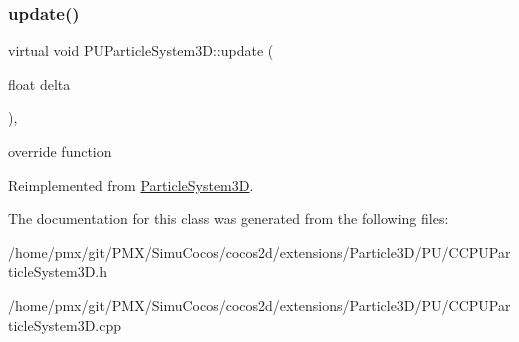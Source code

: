 \subsubsection{\texorpdfstring{update()}{update()}\hspace{0.1cm}{\footnotesize\ttfamily [2/2]}}
{\footnotesize\ttfamily virtual void P\+U\+Particle\+System3\+D\+::update (\begin{DoxyParamCaption}\item[{float}]{delta }\end{DoxyParamCaption})\hspace{0.3cm}{\ttfamily [override]}, {\ttfamily [virtual]}}

override function 

Reimplemented from \hyperlink{classParticleSystem3D_a04fb4f09a517f393b5deb8174b964e40}{Particle\+System3D}.



The documentation for this class was generated from the following files\+:\begin{DoxyCompactItemize}
\item 
/home/pmx/git/\+P\+M\+X/\+Simu\+Cocos/cocos2d/extensions/\+Particle3\+D/\+P\+U/C\+C\+P\+U\+Particle\+System3\+D.\+h\item 
/home/pmx/git/\+P\+M\+X/\+Simu\+Cocos/cocos2d/extensions/\+Particle3\+D/\+P\+U/C\+C\+P\+U\+Particle\+System3\+D.\+cpp\end{DoxyCompactItemize}
